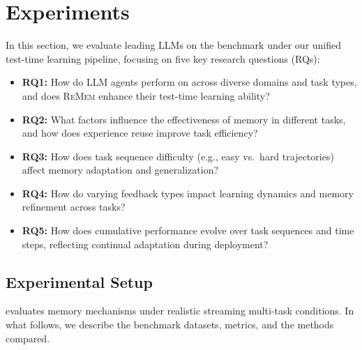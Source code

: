 \section{Experiments}
In this section, we evaluate leading LLMs on the \method benchmark under our unified test-time learning pipeline, focusing on five key research questions (RQs):
\begin{itemize}[itemsep=0pt,topsep=2pt,leftmargin=*]
    \item \textbf{RQ1:} How do LLM agents perform on \method across diverse domains and task types, and does \textsc{ReMem} enhance their test-time learning ability?
    \item \textbf{RQ2:} What factors influence the effectiveness of memory in different tasks, and how does experience reuse improve task efficiency?
    \item \textbf{RQ3:} How does task sequence difficulty (e.g., easy vs.\ hard trajectories) affect memory adaptation and generalization?
    \item \textbf{RQ4:} How do varying feedback types impact learning dynamics and memory refinement across tasks?
    \item \textbf{RQ5:} How does cumulative performance evolve over task sequences and time steps, reflecting continual adaptation during deployment?
\end{itemize}





\subsection{Experimental Setup}

\method evaluates memory mechanisms under realistic streaming multi-task conditions. In what follows, we describe the benchmark datasets, metrics, and the methods compared.


